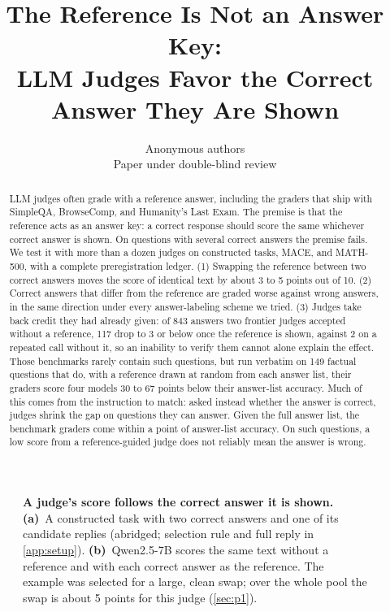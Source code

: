 \documentclass{article}
\title{The Reference Is Not an Answer Key:\\LLM Judges Favor the Correct Answer They Are Shown}
\author{Anonymous authors\\Paper under double-blind review}
\begin{document}
\maketitle
\raggedbottom

\begin{abstract}
LLM judges often grade with a reference answer, including the graders that ship with SimpleQA, BrowseComp, and Humanity's Last Exam.
The premise is that the reference acts as an answer key: a correct response should score the same whichever correct answer is shown.
On questions with several correct answers the premise fails.
We test it with more than a dozen judges on constructed tasks, MACE, and MATH-500, with a complete preregistration ledger.
(1) Swapping the reference between two correct answers moves the score of identical text by about 3 to 5 points out of 10.
(2) Correct answers that differ from the reference are graded worse against wrong answers, in the same direction under every answer-labeling scheme we tried.
(3) Judges take back credit they had already given: of 843 answers two frontier judges accepted without a reference, 117 drop to 3 or below once the reference is shown, against 2 on a repeated call without it, so an inability to verify them cannot alone explain the effect.
Those benchmarks rarely contain such questions, but run verbatim on 149 factual questions that do, with a reference drawn at random from each answer list, their graders score four models 30 to 67 points below their answer-list accuracy.
Much of this comes from the instruction to match: asked instead whether the answer is correct, judges shrink the gap on questions they can answer.
Given the full answer list, the benchmark graders come within a point of answer-list accuracy.
On such questions, a low score from a reference-guided judge does not reliably mean the answer is wrong.
\end{abstract}

\begin{figure}[!b]
\centering
\resizebox{0.75\textwidth}{!}{}
\caption{\textbf{A judge's score follows the correct answer it is shown.}
\textbf{(a)}~A constructed task with two correct answers and one of its candidate replies (abridged; selection rule and full reply in \cref{app:setup}).
\textbf{(b)}~Qwen2.5-7B scores the same text without a reference and with each correct answer as the reference. The example was selected for a large, clean swap; over the whole pool the swap is about 5 points for this judge (\cref{sec:p1}).}
\label{fig:concept}
\end{figure}
\end{document}
